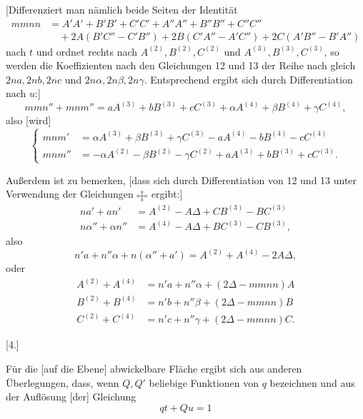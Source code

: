 %
[Differenziert man nämlich beide Seiten der Identität
\[
\begin{aligned}
mmnn&=A'A'+B'B'+C'C'+A''A''+B''B''+C''C''\\
&\quad+2A(B'C''-C'B'')+2B(C'A''-A'C'')+2C(A'B''-B'A'')
\end{aligned}
\]
nach $t$ und ordnet rechts nach $A^{(2)},B^{(2)},C^{(2)}$ und $A^{(3)},B^{(3)},C^{(3)}$, so werden die Koeffizienten nach den Gleichungen 12 und 13 der Reihe nach gleich $2na,2nb,2nc$ und $2n\alpha,2n\beta,2n\gamma$. Entsprechend ergibt sich durch Differentiation nach $u$:]
\[
mmn''+mnm''=aA^{(3)}+bB^{(3)}+cC^{(3)}+\alpha A^{(4)}+\beta B^{(4)}+\gamma C^{(4)},
\]
also [wird]
\begin{equation}\tag*{$(\odot)$}
\left\{\begin{aligned}
mnm'&=\alpha A^{(3)}+\beta B^{(3)}+\gamma C^{(3)}-aA^{(4)}-bB^{(4)}-cC^{(4)}\\
mnm''&=-\alpha A^{(2)}-\beta B^{(2)}-\gamma C^{(2)}+aA^{(3)}+bB^{(3)}+cC^{(3)}.
\end{aligned}\right.
\end{equation}
\par\indent Außerdem ist zu bemerken, [dass sich durch Differentiation von 12 und 13 unter Verwendung der Gleichungen $\FourRingCross$ ergibt:]
\[
\begin{aligned}
na'+an'&=A^{(2)}-A\Delta+CB^{(3)}-BC^{(3)}\\
n\alpha''+\alpha n''&=A^{(4)}-A\Delta+BC^{(3)}-CB^{(3)},
\end{aligned}
\]
also
\[
n'a+n''\alpha+n(\alpha''+a')=A^{(2)}+A^{(4)}-2A\Delta,
\]
oder
\[
\begin{aligned}
A^{(2)}+A^{(4)}&=n'a+n''\alpha+(2\Delta-mmnn)A\\
B^{(2)}+B^{(4)}&=n'b+n''\beta+(2\Delta-mmnn)B\\
C^{(2)}+C^{(4)}&=n'c+n''\gamma+(2\Delta-mmnn)C.
\end{aligned}
\]
\begin{center}[4.]\end{center}
\noindent\hspace*{1.2em} Für die [auf die Ebene] abwickelbare Fläche ergibt sich aus anderen Überlegungen, dass, wenn $Q,Q'$ beliebige Funktionen von $q$ bezeichnen und aus der Auflösung [der] Gleichung
\[
qt+Qu=1
\]

